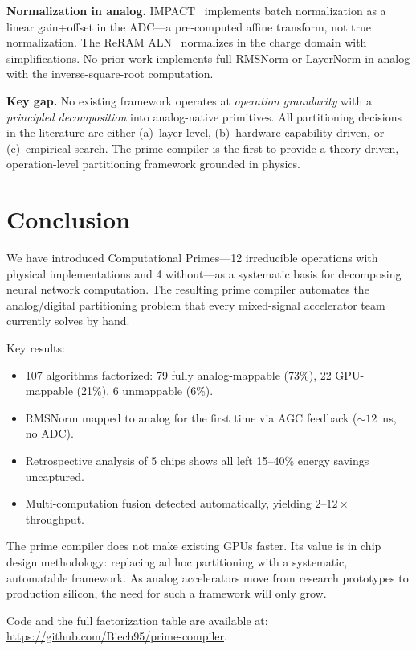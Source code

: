 \documentclass[11pt]{article}
\begin{document}
\textbf{Normalization in analog.} IMPACT~\cite{impact2023} implements batch normalization as a linear gain+offset in the ADC---a pre-computed affine transform, not true normalization. The ReRAM ALN~\cite{reram_aln2022} normalizes in the charge domain with simplifications. No prior work implements full RMSNorm or LayerNorm in analog with the inverse-square-root computation.

\textbf{Key gap.} No existing framework operates at \textit{operation granularity} with a \textit{principled decomposition} into analog-native primitives. All partitioning decisions in the literature are either (a)~layer-level, (b)~hardware-capability-driven, or (c)~empirical search. The prime compiler is the first to provide a theory-driven, operation-level partitioning framework grounded in physics.

\section{Conclusion}

We have introduced Computational Primes---12 irreducible operations with physical implementations and 4 without---as a systematic basis for decomposing neural network computation. The resulting prime compiler automates the analog/digital partitioning problem that every mixed-signal accelerator team currently solves by hand.

Key results:
\begin{itemize}[leftmargin=*]
\item 107 algorithms factorized: 79 fully analog-mappable (73\%), 22 GPU-mappable (21\%), 6 unmappable (6\%).
\item RMSNorm mapped to analog for the first time via AGC feedback (${\sim}12$~ns, no ADC).
\item Retrospective analysis of 5 chips shows all left 15--40\% energy savings uncaptured.
\item Multi-computation fusion detected automatically, yielding $2$--$12\times$ throughput.
\end{itemize}

The prime compiler does not make existing GPUs faster. Its value is in chip design methodology: replacing ad hoc partitioning with a systematic, automatable framework. As analog accelerators move from research prototypes to production silicon, the need for such a framework will only grow.

Code and the full factorization table are available at: \url{https://github.com/Biech95/prime-compiler}.
\end{document}
